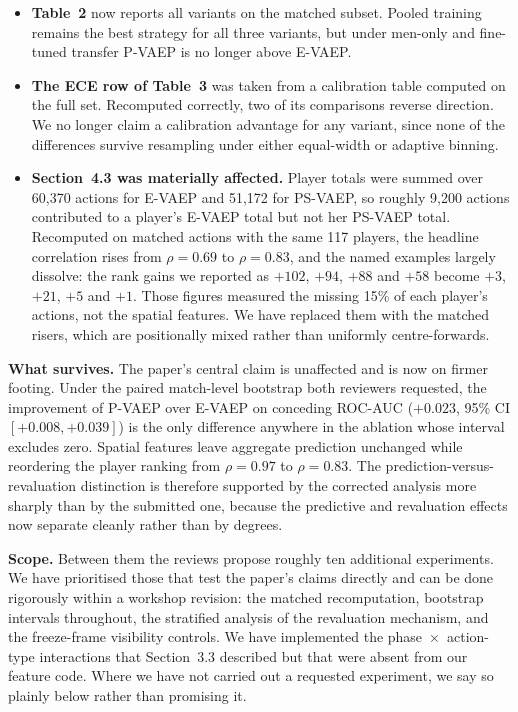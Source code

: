 \documentclass[11pt,a4paper]{article}
\begin{document}
\begin{itemize}
  \item \textbf{Table~2} now reports all variants on the matched subset. Pooled training
    remains the best strategy for all three variants, but under men-only and fine-tuned
    transfer P-VAEP is no longer above E-VAEP.
  \item \textbf{The ECE row of Table~3} was taken from a calibration table computed on the
    full set. Recomputed correctly, two of its comparisons reverse direction. We no longer
    claim a calibration advantage for any variant, since none of the differences survive
    resampling under either equal-width or adaptive binning.
  \item \textbf{Section~4.3 was materially affected.} Player totals were summed over
    60{,}370 actions for E-VAEP and 51{,}172 for PS-VAEP, so roughly 9{,}200 actions
    contributed to a player's E-VAEP total but not her PS-VAEP total. Recomputed on
    matched actions with the same 117 players, the headline correlation rises from
    $\rho = 0.69$ to $\rho = 0.83$, and the named examples largely dissolve: the rank gains
    we reported as $+102$, $+94$, $+88$ and $+58$ become $+3$, $+21$, $+5$ and $+1$. Those
    figures measured the missing 15\% of each player's actions, not the spatial features.
    We have replaced them with the matched risers, which are positionally mixed rather than
    uniformly centre-forwards.
\end{itemize}

\textbf{What survives.} The paper's central claim is unaffected and is now on firmer
footing. Under the paired match-level bootstrap both reviewers requested, the improvement
of P-VAEP over E-VAEP on conceding ROC-AUC ($+0.023$, 95\% CI $[+0.008, +0.039]$) is the
only difference anywhere in the ablation whose interval excludes zero. Spatial features
leave aggregate prediction unchanged while reordering the player ranking from
$\rho = 0.97$ to $\rho = 0.83$. The prediction-versus-revaluation distinction is therefore
supported by the corrected analysis more sharply than by the submitted one, because the
predictive and revaluation effects now separate cleanly rather than by degrees.

\textbf{Scope.} Between them the reviews propose roughly ten additional experiments. We
have prioritised those that test the paper's claims directly and can be done rigorously
within a workshop revision: the matched recomputation, bootstrap intervals throughout, the
stratified analysis of the revaluation mechanism, and the freeze-frame visibility controls.
We have implemented the phase~$\times$~action-type interactions that Section~3.3 described
but that were absent from our feature code. Where we have not carried out a requested
experiment, we say so plainly below rather than promising it.
\end{document}
